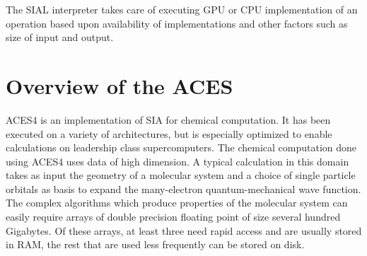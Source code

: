The SIAL interpreter takes care of executing GPU or CPU implementation of an
operation based upon availability of implementations and other factors such as
size of input and output.

\section{Overview of the ACES}
ACES4 is an implementation of SIA for chemical computation. It has been executed
on a variety of architectures, but is especially optimized to enable
calculations on leadership class supercomputers. The chemical computation done
using ACES4 uses data of high dimension. A typical calculation in this domain
takes as input the geometry of a molecular system and a choice of single
particle orbitals as basis to expand the many-electron quantum-mechanical wave
function. The complex algorithms which produce properties of the molecular
system can easily require arrays of double precision floating point of size
several hundred Gigabytes. Of these arrays, at least three need rapid access and
are usually stored in RAM, the rest that are used less frequently can be stored
on disk.